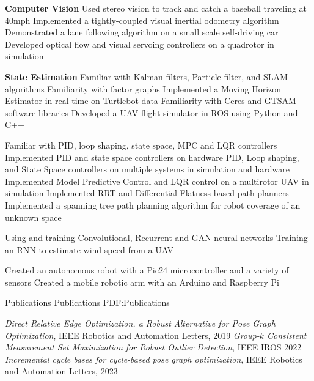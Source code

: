\documentclass[letterpaper,MMMyyyy,nonstopmode]{simpleresumecv}
\begin{document}
\begin{Body}
\Gap
\Entry
{\textbf{Computer Vision}}
\Gap
\BulletItem
Used stereo vision to track and catch a baseball traveling at  40mph
\BulletItem
Implemented a tightly-coupled visual inertial odometry algorithm
\BulletItem
Demonstrated a lane following algorithm on a small scale self-driving car
\BulletItem
Developed optical flow and visual servoing controllers on a quadrotor in simulation

\Gap
\Entry
{\textbf{State Estimation}}
\Gap
\BulletItem
Familiar with Kalman filters, Particle filter, and SLAM algorithms
\BulletItem
Familiarity with factor graphs
\BulletItem
Implemented a Moving Horizon Estimator in real time on Turtlebot data
\BulletItem
Familiarity with Ceres and GTSAM software libraries
\BulletItem
Developed a UAV flight simulator in ROS using Python and C++

\Gap
{}
\Gap
\BulletItem
Familiar with PID, loop shaping, state space, MPC and LQR controllers
\BulletItem
Implemented PID and state space controllers on hardware
\BulletItem
    PID, Loop shaping, and State Space controllers on multiple systems in simulation and hardware
\BulletItem
    Implemented Model Predictive Control and LQR control on a multirotor UAV in simulation
\BulletItem
    Implemented RRT and Differential Flatness based path planners
\BulletItem
    Implemented a spanning tree path planning algorithm for robot coverage of an unknown space

\Gap
{}
\Gap
\BulletItem
    Using and training Convolutional, Recurrent and GAN neural networks
\BulletItem
    Training an RNN to estimate wind speed from a UAV


\Gap
{}
\Gap
\BulletItem
Created an autonomous robot with a Pic24 microcontroller and a variety of sensors
\BulletItem
Created a  mobile robotic arm with an Arduino and Raspberry Pi


\Section
{Publications}
{Publications}
{PDF:Publications}

\BulletItem
\textit{Direct Relative Edge Optimization, a Robust Alternative for Pose Graph Optimization}, IEEE Robotics and Automation Letters, 2019
\BulletItem \textit{Group-$k$ Consistent Measurement Set Maximization for Robust Outlier Detection}, IEEE IROS 2022
\BulletItem \textit{Incremental cycle bases for cycle-based pose graph optimization}, IEEE Robotics and Automation Letters, 2023



\end{Body}
\end{document}

